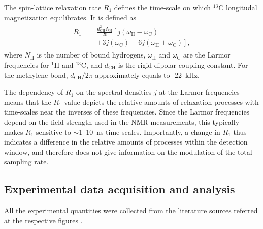 \documentclass[journal=jpcbfk,manuscript=article,layout=twocolumn]{achemso}
\begin{document}
The spin-lattice relaxation rate $R_1$ defines the time-scale on which $^{13}$C longitudal magnetization equilibrates. It is defined as  
\begin{align}
\label{eq:R1}
\begin{split}
R_{1}=&\frac{d^2_{\mathrm{CH}}N_{\mathrm{H}}}{20}\left[j(\omega_{\mathrm{H}}-\omega_{\mathrm{C}})\right. \\
&\left.+3j(\omega_{\mathrm{C}})+6j(\omega_{\mathrm{H}}+\omega_{\mathrm{C}})\right] ,
\end{split}
\end{align}
where $N_{\mathrm{H}}$ is the number of bound hydrogens, $\omega_{\mathrm{H}}$ and $\omega_{\mathrm{C}}$ are the Larmor frequencies for $^{1}$H and $^{13}$C, and $d_{\mathrm{CH}}$ is the rigid dipolar coupling constant. For the methylene bond, $d_{\mathrm{CH}}/2\pi$ approximately equals to -22~kHz.

The dependency of $R_{1}$ on the spectral densities $j$ at the Larmor frequencies means that the $R_{1}$ value depicts the relative amounts of relaxation processes with time-scales near the inverses of these frequencies. Since the Larmor frequencies depend on the field strength used in the NMR measurements, this typically makes $R_{1}$ sensitive to $\sim$1--10~ns time-scales. Importantly, a change in $R_{1}$ thus indicates a difference in the relative amounts of processes within the detection window, and therefore does not give information on the modulation of the total sampling rate.  

\subsection{Experimental data acquisition and analysis}
%
All the experimental quantities were collected from the literature  sources referred at the respective figures .   
\end{document}
